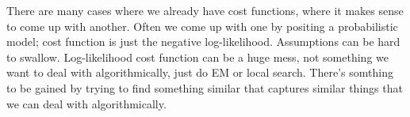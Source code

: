 
There are many cases where we already have cost functions, where it makes sense to come up with another. Often we come up with one by positing a probabilistic model; cost function is just the negative log-likelihood. Assumptions can be hard to swallow. Log-likelihood cost function can be a huge mess, not something we want to deal with algorithmically, just do EM or local search. There's somthing to be gained by trying to find something similar that captures similar things that we can deal with algorithmically.


